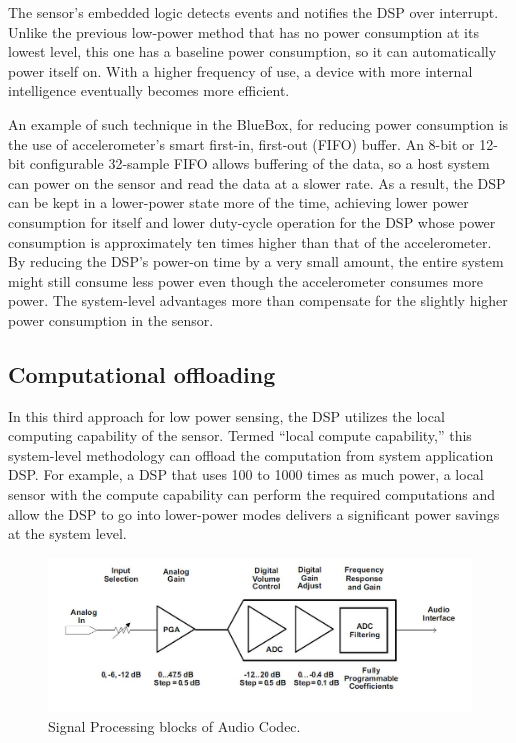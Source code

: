 The sensor's embedded logic detects events and notifies the DSP over
interrupt. Unlike the previous low-power method that has no power
consumption at its lowest level, this one has a baseline power
consumption, so it can automatically power itself on. With a higher
frequency of use, a device with more internal intelligence eventually
becomes more efficient. 
 
An example of such technique in the BlueBox, for reducing power
consumption is the use of accelerometer’s smart first-in, first-out
(FIFO) buffer. An 8-bit or 12-bit configurable 32-sample FIFO allows
buffering of the data, so a host system can power on the sensor and
read the data at a slower rate. As a result, the DSP can be kept in a
lower-power state more of the time, achieving lower power consumption
for itself and lower duty-cycle operation for the DSP whose power
consumption is approximately ten times higher than that of the
accelerometer. By reducing the DSP’s power-on time by a very small
amount, the entire system might still consume less power even though
the accelerometer consumes more power. The system-level advantages
more than compensate for the slightly higher power consumption in the
sensor. 
 
 \subsection{Computational offloading}

 In this third approach for low power sensing, the DSP utilizes the
 local computing capability of the sensor. Termed ``local compute
 capability,'' this system-level methodology can offload the
 computation from system application DSP. For example, a DSP that
 uses 100 to 1000 times as much power, a local sensor with the
 compute capability can perform the required computations and allow
 the DSP to go into lower-power modes delivers a significant power
 savings at the system level.
 
  \begin{figure}
 	\centering
 	\includegraphics[scale = 0.5 ]{AIC_processingBlock}
 	\caption{Signal Processing blocks of Audio Codec.  \cite{audiocodec}}
\label{AIC_processingBlock}
 \end{figure}
 
